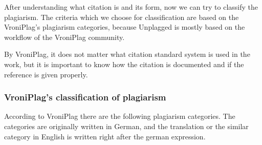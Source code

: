 After understanding what citation is and its form, now we can try to classify the plagiarism. The criteria which we 
choose for classification are based on the VroniPlag’s plagiarism categories, because Unplagged is mostly based 
on the workflow of the VroniPlag community. 

By VroniPlag, it does not matter what citation standard system is used in the work, but it is important to know how the 
citation is documented and if the reference is given properly.

\subsubsection{VroniPlag’s classification of plagiarism}\label{sec:classification}

According to VroniPlag\citep{} there are the following plagiarism categories. 
The categories are originally written in German, and the translation or the similar category in English is written 
right after the german expression.

